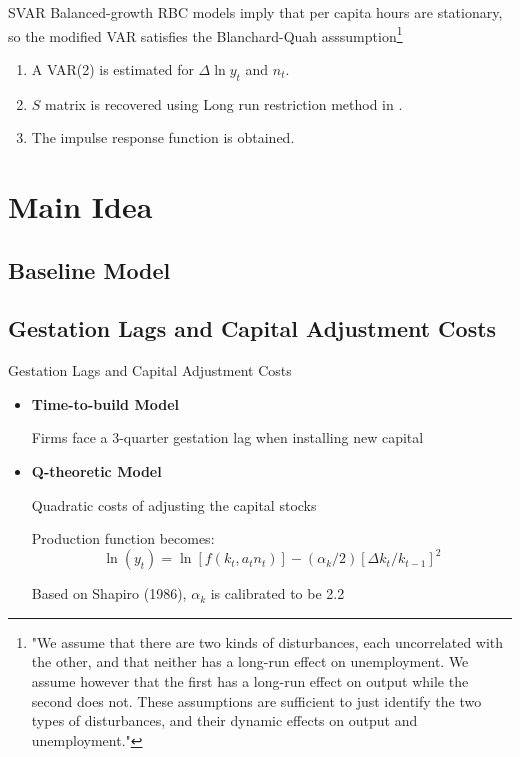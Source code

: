 \documentclass[10pt]{beamer}
\begin{document}
\begin{frame}{SVAR}
    Balanced-growth RBC models imply that per capita hours are stationary, so the modified VAR satisfies the Blanchard-Quah asssumption\footnote{"We assume that there are two kinds of disturbances, each uncorrelated with the other, and that neither has a long-run effect on unemployment. We assume however that the first has a long-run effect on output while the second does not. These assumptions are sufficient to just identify the two types of disturbances, and their dynamic effects on output and unemployment."}
    \begin{enumerate}
        \item A VAR(2) is estimated for $\Delta \ln y_t$ and $n_t$.
        \item $S$ matrix is recovered using Long run restriction method in \cite{blanchard_quah_1988}.
        \item The impulse response function is obtained.
    \end{enumerate} 

\end{frame}


\section{Main Idea}
\subsection{Baseline Model}

\subsection{Gestation Lags and Capital Adjustment Costs}

\begin{frame}{Gestation Lags and Capital Adjustment Costs}

    \begin{itemize}
        \item \textbf{Time-to-build Model}

              Firms face a 3-quarter gestation lag when installing new capital

        \item \textbf{Q-theoretic Model}

              Quadratic costs of adjusting the capital stocks

              Production function becomes: $$ \ln \left(y_t\right)= \ln \left[f\left(k_t, a_t
                      n_t\right)\right] -\left(\alpha_{k} / 2\right)\left[\Delta k_t /
                      k_{t-1}\right]^2 $$

              Based on Shapiro (1986), $\alpha_{k}$ is calibrated to be 2.2
    \end{itemize}

\end{frame}
\end{document}
